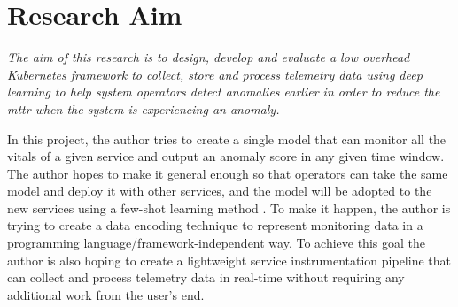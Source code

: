 \section{Research Aim}

\textit{The aim of this research is to design, develop and evaluate a low overhead Kubernetes framework to collect, store and process telemetry data using deep learning to help system operators detect anomalies earlier in order to reduce the \ac{mttr} when the system is experiencing an anomaly.}

In this project, the author tries to create a single model that can monitor all the vitals of a given service and output an anomaly score in any given time window. The author hopes to make it general enough so that operators can take the same model and deploy it with other services, and the model will be adopted to the new services using a few-shot learning method \citep{wang2020generalizing}. To make it happen, the author is trying to create a data encoding technique to represent monitoring data in a programming language/framework-independent way. To achieve this goal the author is also hoping to create a lightweight service instrumentation pipeline that can collect and process telemetry data in real-time without requiring any additional work from the user's end.